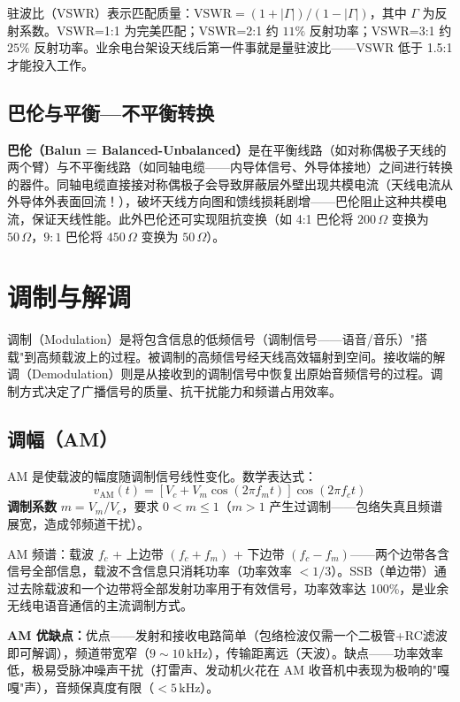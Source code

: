 \documentclass[12pt,UTF8]{ctexbook}
\begin{document}
驻波比（VSWR）表示匹配质量：$\mathrm{VSWR} = (1+|\Gamma|)/(1-|\Gamma|)$，其中 $\Gamma$ 为反射系数。VSWR=1:1 为完美匹配；VSWR=2:1 约 $11\%$ 反射功率；VSWR=3:1 约 $25\%$ 反射功率。业余电台架设天线后第一件事就是量驻波比——VSWR 低于 1.5:1 才能投入工作。

\subsection{巴伦与平衡—不平衡转换}

\textbf{巴伦（Balun = Balanced-Unbalanced）}是在平衡线路（如对称偶极子天线的两个臂）与不平衡线路（如同轴电缆——内导体信号、外导体接地）之间进行转换的器件。同轴电缆直接接对称偶极子会导致屏蔽层外壁出现共模电流（天线电流从外导体外表面回流！），破坏天线方向图和馈线损耗剧增——巴伦阻止这种共模电流，保证天线性能。此外巴伦还可实现阻抗变换（如 4:1 巴伦将 $200\,\Omega$ 变换为 $50\,\Omega$，$9:1$ 巴伦将 $450\,\Omega$ 变换为 $50\,\Omega$）。

\section{调制与解调}
\label{sec:modulation}

调制（Modulation）是将包含信息的低频信号（调制信号——语音/音乐）"搭载"到高频载波上的过程。被调制的高频信号经天线高效辐射到空间。接收端的解调（Demodulation）则是从接收到的调制信号中恢复出原始音频信号的过程。调制方式决定了广播信号的质量、抗干扰能力和频谱占用效率。

\subsection{调幅（AM）}

AM 是使载波的幅度随调制信号线性变化。数学表达式：
\[
v_{\text{AM}}(t) = [V_c + V_m \cos(2\pi f_m t)] \cos(2\pi f_c t)
\]
\textbf{调制系数} $m = V_m/V_c$，要求 $0 < m \le 1$（$m>1$ 产生过调制——包络失真且频谱展宽，造成邻频道干扰）。

AM 频谱：载波 $f_c$ + 上边带 $(f_c+f_m)$ + 下边带 $(f_c-f_m)$——两个边带各含信号全部信息，载波不含信息只消耗功率（功率效率 $<1/3$）。SSB（单边带）通过去除载波和一个边带将全部发射功率用于有效信号，功率效率达 100\%，是业余无线电语音通信的主流调制方式。

\textbf{AM 优缺点：}优点——发射和接收电路简单（包络检波仅需一个二极管+RC滤波即可解调），频道带宽窄（$9\sim10\,\mathrm{kHz}$），传输距离远（天波）。缺点——功率效率低，极易受脉冲噪声干扰（打雷声、发动机火花在 AM 收音机中表现为极响的"嘎嘎"声），音频保真度有限（$<5\,\mathrm{kHz}$）。
\end{document}
